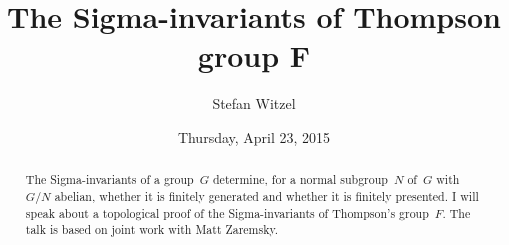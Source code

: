 \documentclass{UAmathtalk}
\author{Stefan Witzel}
\title{The Sigma-invariants of Thompson group F}
\date{Thursday, April 23, 2015}
\begin{document}
\maketitle

\begin{abstract}
The Sigma-invariants of a group~$G$ determine, for a normal subgroup~$N$ of~$G$ with $G/N$ abelian, whether it is finitely generated and whether it is finitely presented. I will speak about a topological proof of the Sigma-invariants of Thompson's group~$F$. The talk is based on joint work with Matt Zaremsky.
\end{abstract}
\end{document}
